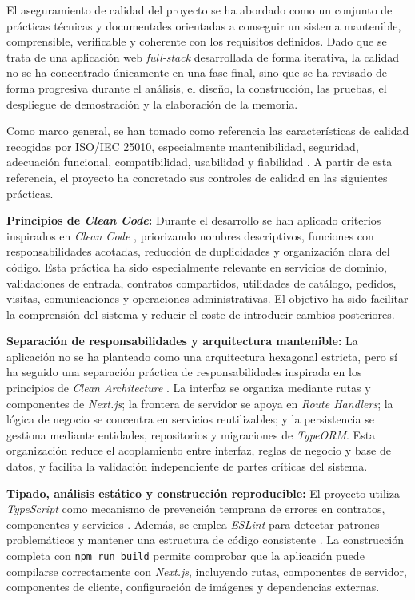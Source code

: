 El aseguramiento de calidad del proyecto se ha abordado como un conjunto de prácticas técnicas y documentales orientadas a conseguir un sistema mantenible, comprensible, verificable y coherente con los requisitos definidos. Dado que se trata de una aplicación web \textit{full-stack} desarrollada de forma iterativa, la calidad no se ha concentrado únicamente en una fase final, sino que se ha revisado de forma progresiva durante el análisis, el diseño, la construcción, las pruebas, el despliegue de demostración y la elaboración de la memoria.

Como marco general, se han tomado como referencia las características de calidad recogidas por ISO/IEC 25010, especialmente mantenibilidad, seguridad, adecuación funcional, compatibilidad, usabilidad y fiabilidad \citep{iso25010}. A partir de esta referencia, el proyecto ha concretado sus controles de calidad en las siguientes prácticas.

\textbf{Principios de \textit{Clean Code}:} Durante el desarrollo se han aplicado criterios inspirados en \textit{Clean Code} \citep{martin2008cleancode}, priorizando nombres descriptivos, funciones con responsabilidades acotadas, reducción de duplicidades y organización clara del código. Esta práctica ha sido especialmente relevante en servicios de dominio, validaciones de entrada, contratos compartidos, utilidades de catálogo, pedidos, visitas, comunicaciones y operaciones administrativas. El objetivo ha sido facilitar la comprensión del sistema y reducir el coste de introducir cambios posteriores.

\textbf{Separación de responsabilidades y arquitectura mantenible:} La aplicación no se ha planteado como una arquitectura hexagonal estricta, pero sí ha seguido una separación práctica de responsabilidades inspirada en los principios de \textit{Clean Architecture} \citep{martin2017cleanarchitecture}. La interfaz se organiza mediante rutas y componentes de \textit{Next.js}; la frontera de servidor se apoya en \textit{Route Handlers}; la lógica de negocio se concentra en servicios reutilizables; y la persistencia se gestiona mediante entidades, repositorios y migraciones de \textit{TypeORM}. Esta organización reduce el acoplamiento entre interfaz, reglas de negocio y base de datos, y facilita la validación independiente de partes críticas del sistema.

\textbf{Tipado, análisis estático y construcción reproducible:} El proyecto utiliza \textit{TypeScript} como mecanismo de prevención temprana de errores en contratos, componentes y servicios \citep{typescriptdocs2026}. Además, se emplea \textit{ESLint} para detectar patrones problemáticos y mantener una estructura de código consistente \citep{eslintdocs2026}. La construcción completa con \texttt{npm run build} permite comprobar que la aplicación puede compilarse correctamente con \textit{Next.js}, incluyendo rutas, componentes de servidor, componentes de cliente, configuración de imágenes y dependencias externas.

